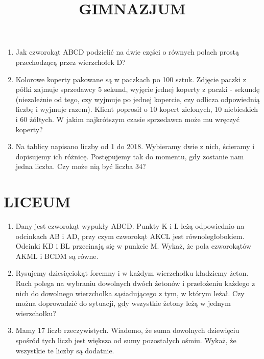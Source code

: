 \documentclass[10pt]{article}
\title{GIMNAZJUM }
\author{}
\date{}
\begin{document}
\maketitle
\begin{enumerate}
  \item Jak czworokąt ABCD podzielić na dwie części o równych polach prostą przechodzącą przez wierzchołek D?
  \item Kolorowe koperty pakowane są w paczkach po 100 sztuk. Zdjęcie paczki z półki zajmuje sprzedawcy 5 sekund, wyjęcie jednej koperty z paczki - sekundę (niezależnie od tego, czy wyjmuje po jednej kopercie, czy odlicza odpowiednią liczbę i wyjmuje razem). Klient poprosił o 10 kopert zielonych, 10 niebieskich i 60 żółtych. W jakim najkrótszym czasie sprzedawca może mu wręczyć koperty?
  \item Na tablicy napisano liczby od 1 do 2018. Wybieramy dwie z nich, ścieramy i dopisujemy ich różnicę. Postępujemy tak do momentu, gdy zostanie nam jedna liczba. Czy może nią być liczba 34?
\end{enumerate}

\section*{LICEUM}
\begin{enumerate}
  \item Dany jest czworokąt wypukły ABCD. Punkty K i L leżą odpowiednio na odcinkach AB i AD, przy czym czworokąt AKCL jest równoległobokiem. Odcinki KD i BL przecinają się w punkcie M. Wykaż, że pola czworokątów AKML i BCDM są równe.
  \item Rysujemy dziesięciokąt foremny i w każdym wierzchołku kładziemy żeton. Ruch polega na wybraniu dowolnych dwóch żetonów i przełożeniu każdego z nich do dowolnego wierzchołka sąsiadującego z tym, w którym leżał. Czy można doprowadzić do sytuacji, gdy wszystkie żetony leżą w jednym wierzchołku?
  \item Mamy 17 liczb rzeczywistych. Wiadomo, że suma dowolnych dziewięciu spośród tych liczb jest większa od sumy pozostałych ośmiu. Wykaż, że wszystkie te liczby są dodatnie.
\end{enumerate}
\end{document}
